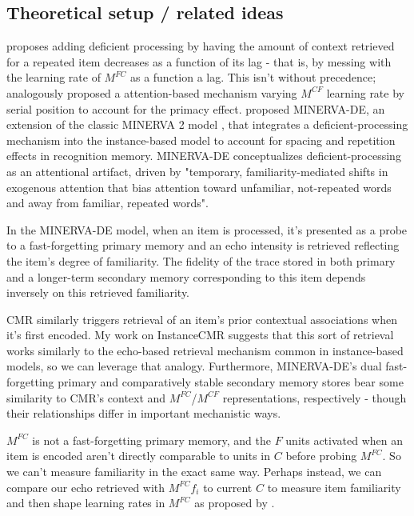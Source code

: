 \subsection{Theoretical setup / related ideas}
\citet{siegel2014retrieved} proposes adding deficient processing by having the amount of context retrieved for a repeated item decreases as a function of its lag - that is, by messing with the learning rate of $M^{FC}$ as a function a lag. This isn't without precedence; \citep{sederberg2008context} analogously proposed a attention-based mechanism varying $M^{CF}$ learning rate by serial position to account for the primacy effect.  \citet{collins2020minerva} proposed MINERVA-DE, an extension of the classic MINERVA 2 model \citep{hintzman1984minerva}, that integrates a deficient-processing mechanism into the instance-based model to account for spacing and repetition effects in recognition memory. MINERVA-DE conceptualizes deficient-processing as an attentional artifact, driven by "temporary, familiarity-mediated shifts in exogenous attention that bias attention toward unfamiliar, not-repeated words and away from familiar, repeated words".

In the MINERVA-DE model, when an item is processed, it's presented as a probe to a fast-forgetting primary memory and an echo intensity is retrieved reflecting the item's degree of familiarity. The fidelity of the trace stored in both primary and a longer-term secondary memory corresponding to this item depends inversely on this retrieved familiarity. 

CMR similarly triggers retrieval of an item's prior contextual associations when it's first encoded. My work on InstanceCMR suggests that this sort of retrieval works similarly to the echo-based retrieval mechanism common in instance-based models, so we can leverage that analogy. Furthermore, MINERVA-DE's dual fast-forgetting primary and comparatively stable secondary memory stores bear some similarity to CMR's context and $M^{FC}$/$M^{CF}$ representations, respectively - though their relationships differ in important mechanistic ways. 

$M^{FC}$ is not a fast-forgetting primary memory, and the $F$ units activated when an item is encoded aren't directly comparable to units in $C$ before probing $M^{FC}$. So we can't measure familiarity in the exact same way. Perhaps instead, we can compare our echo retrieved with $M^{FC} f_i$ to current $C$ to measure item familiarity and then shape learning rates in $M^{FC}$ as proposed by \citet{siegel2014retrieved}.

